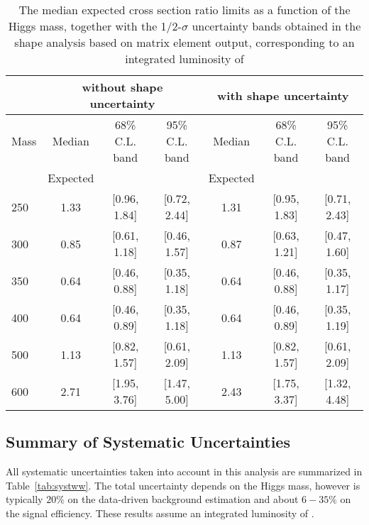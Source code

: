 \begin{table}[!htbp]
\begin{center}
{\normalsize
\begin{tabular}{|l|c|c|c|c|c|c|}
\hline
      &  \multicolumn{3}{c|}{ without shape uncertainty} &\multicolumn{3}{c|}{ with shape uncertainty} \\
\hline
Mass  &  Median      &     68\% C.L. band &  95\% C.L. band &  Median	   &	 68\% C.L. band &  95\% C.L. band\\
      &  Expected    &                    &                 &  Expected    &			&		 \\
\hline
250 & 1.33 & [0.96, 1.84] & [0.72, 2.44] & 1.31 & [0.95, 1.83] & [0.71, 2.43] \\
300 & 0.85 & [0.61, 1.18] & [0.46, 1.57] & 0.87 & [0.63, 1.21] & [0.47, 1.60] \\
350 & 0.64 & [0.46, 0.88] & [0.35, 1.18] & 0.64 & [0.46, 0.88] & [0.35, 1.17] \\
400 & 0.64 & [0.46, 0.89] & [0.35, 1.18] & 0.64 & [0.46, 0.89] & [0.35, 1.19] \\
500 & 1.13 & [0.82, 1.57] & [0.61, 2.09] & 1.13 & [0.82, 1.57] & [0.61, 2.09] \\
600 & 2.71 & [1.95, 3.76] & [1.47, 5.00] & 2.43 & [1.75, 3.37] & [1.32, 4.48] \\
\hline
\end{tabular}
}
\end{center}
\caption{The median expected cross section ratio limits as a function 
of the Higgs mass, together with the 1/2-$\sigma$ uncertainty bands obtained in the shape analysis based on matrix element output, 
corresponding to an integrated luminosity of \intlumi}
\label{tab:limits_meshape_uncert_5fb}
\end{table}




\subsection{Summary of Systematic Uncertainties}

All systematic uncertainties taken into account in this analysis
are summarized in Table~\ref{tab:systww}.
The total uncertainty depends on the Higgs mass, %
however is typically $20\%$ on the data-driven background estimation and about $6-35\%$ 
on the signal efficiency. These results assume an integrated luminosity of \intlumi. 

